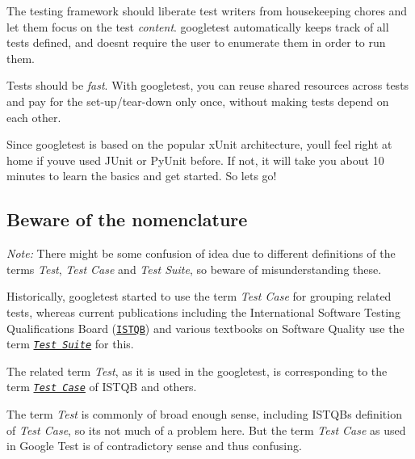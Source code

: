 \begin{DoxyEnumerate}
\item The testing framework should liberate test writers from housekeeping chores and let them focus on the test {\itshape content}. googletest automatically keeps track of all tests defined, and doesn\textquotesingle{}t require the user to enumerate them in order to run them.
\end{DoxyEnumerate}
\begin{DoxyEnumerate}
\item Tests should be {\itshape fast}. With googletest, you can reuse shared resources across tests and pay for the set-\/up/tear-\/down only once, without making tests depend on each other.
\end{DoxyEnumerate}

Since googletest is based on the popular x\+Unit architecture, you\textquotesingle{}ll feel right at home if you\textquotesingle{}ve used J\+Unit or Py\+Unit before. If not, it will take you about 10 minutes to learn the basics and get started. So let\textquotesingle{}s go!

\subsection*{Beware of the nomenclature}

{\itshape Note\+:} There might be some confusion of idea due to different definitions of the terms {\itshape Test}, {\itshape Test Case} and {\itshape Test Suite}, so beware of misunderstanding these.

Historically, googletest started to use the term {\itshape Test Case} for grouping related tests, whereas current publications including the International Software Testing Qualifications Board (\href{http://www.istqb.org/}{\tt I\+S\+T\+QB}) and various textbooks on Software Quality use the term {\itshape \href{http://glossary.istqb.org/search/test%20suite}{\tt Test Suite}} for this.

The related term {\itshape Test}, as it is used in the googletest, is corresponding to the term {\itshape \href{http://glossary.istqb.org/search/test%20case}{\tt Test Case}} of I\+S\+T\+QB and others.

The term {\itshape Test} is commonly of broad enough sense, including I\+S\+T\+QB\textquotesingle{}s definition of {\itshape Test Case}, so it\textquotesingle{}s not much of a problem here. But the term {\itshape Test Case} as used in Google Test is of contradictory sense and thus confusing.

